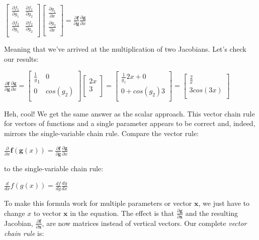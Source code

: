 \documentclass[11pt]{article}
\begin{document}
$
\begin{bmatrix}
	\frac{\partial f_1}{\partial g_1} & \frac{\partial f_1}{\partial g_2}\\
	\frac{\partial f_2}{\partial g_1} & \frac{\partial f_2}{\partial g_2}\\
\end{bmatrix}\begin{bmatrix}
\frac{\partial g_1}{\partial x}\\
\frac{\partial g_2}{\partial x}\\
\end{bmatrix} = \frac{\partial \mathbf{f}}{\partial \mathbf{g}}\frac{\partial \mathbf{g}}{\partial x}
$

Meaning that we've arrived at the multiplication of two Jacobians.  Let's check our results:

$
\frac{\partial \mathbf{f}}{\partial \mathbf{g}}\frac{\partial \mathbf{g}}{\partial x} = \begin{bmatrix}
	\frac{1}g_1 & 0\\
	0 & cos(g_2)\\
\end{bmatrix}\begin{bmatrix}
2x\\
3\\
\end{bmatrix} = \begin{bmatrix}
	\frac{1}{g_1}2x + 0\\
	0 + cos(g_2)3\\
\end{bmatrix} = \begin{bmatrix}
	\frac{2}{x}\\
	3cos(3x)\\
\end{bmatrix}
$

Heh, cool!  We get the same answer as the scalar approach. This vector chain rule for vectors of functions and a single parameter appears to be correct and, indeed, mirrors the single-variable chain rule. Compare the vector rule:

$\frac{\partial}{\partial x} \mathbf{f}(\mathbf{g}(x)) = \frac{\partial \mathbf{f}}{\partial \mathbf{g}}\frac{\partial\mathbf{g}}{\partial x}$

to the single-variable chain rule:

$\frac{d}{dx} f(g(x)) = \frac{df}{dg}\frac{dg}{dx}$

To make this formula work for multiple parameters or vector $\mathbf{x}$, we just have to change $x$ to vector $\mathbf{x}$ in the equation.  The effect is  that $\frac{\partial\mathbf{g}}{\partial \mathbf{x}}$ and the resulting Jacobian,  $\frac{\partial \mathbf{f}}{\partial \mathbf{x}}$, are now matrices instead of  vertical vectors. Our complete {\em vector chain rule} is:
\end{document}

